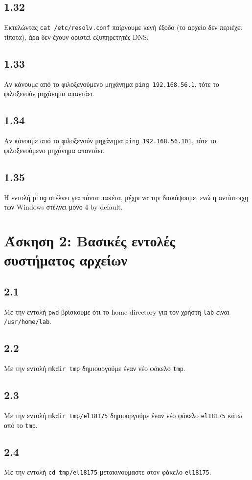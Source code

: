 \documentclass[a4paper, 12pt]{article}
\begin{document}
	\subsection*{1.32}
		Εκτελώντας \verb|cat /etc/resolv.conf| παίρνουμε κενή έξοδο (το αρχείο δεν περιέχει τίποτα), άρα δεν έχουν οριστεί εξυπηρετητές DNS.

	\subsection*{1.33}
		Αν κάνουμε από το φιλοξενούμενο μηχάνημα \verb|ping 192.168.56.1|, τότε το φιλοξενούν μηχάνημα απαντάει.
	
	\subsection*{1.34}
		Αν κάνουμε από το φιλοξενούν μηχάνημα \verb|ping 192.168.56.101|, τότε το φιλοξενούμενο μηχάνημα απαντάει.
	
	\subsection*{1.35}
		Η εντολή \verb|ping| στέλνει για πάντα πακέτα, μέχρι να την διακόψουμε, ενώ η αντίστοιχη των Windows στέλνει μόνο 4 by default.

\section*{Άσκηση 2: Βασικές εντολές συστήματος αρχείων}

	\subsection*{2.1}
		Με την εντολή \verb|pwd| βρίσκουμε ότι το home directory για τον χρήστη \verb|lab| είναι \verb|/usr/home/lab|.

	\subsection*{2.2}
		Mε την εντολή \verb|mkdir tmp| δημιουργούμε έναν νέο φάκελο \verb|tmp|.

	\subsection*{2.3}
		Με την εντολή \verb|mkdir tmp/el18175| δημιουργούμε έναν νέο φάκελο \verb|el18175| κάτω από το \verb|tmp|.

	\subsection*{2.4}
		Με την εντολή \verb|cd tmp/el18175| μετακινούμαστε στον φάκελο \verb|el18175|.
\end{document}
